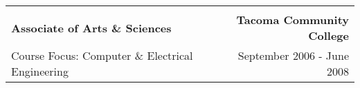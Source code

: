 \documentclass[letterpaper]{article}
\begin{document}
\begin{center}
\begin{tabular}{p{}r}
			\\
			\\
				\textbf{Associate of Arts \& Sciences}		    	&
				\textbf{Tacoma Community College \quad}
			\\
				{\quad Course Focus: Computer \& Electrical Engineering}	&
				{September 2006 - June 2008 \quad\quad}
			\\
		\end{tabular} \\
	\end{center} 
\end{document}
